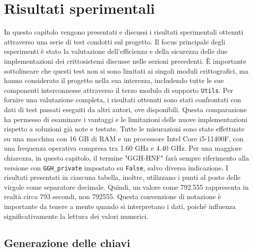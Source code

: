 \chapter{Risultati sperimentali}
\label{sec:risultati_sperimentali}

In questo capitolo vengono presentati e discussi i risultati sperimentali ottenuti 
attraverso una serie di test condotti sul progetto.
Il focus principale degli esperimenti è stato la valutazione dell'efficienza e della 
sicurezza delle due implementazioni dei crittosistemi discusse nelle sezioni precedenti. 
È importante sottolineare che questi test non si sono limitati ai singoli moduli 
crittografici, ma hanno considerato il progetto nella sua interezza, includendo tutte 
le sue componenti interconnesse attraverso il terzo modulo di supporto \texttt{Utils}.
Per fornire una valutazione completa, i risultati ottenuti sono stati confrontati con dati 
di test passati eseguiti da altri autori, ove disponibili. 
Questa comparazione ha permesso di esaminare i vantaggi e le limitazioni delle nuove 
implementazioni rispetto a soluzioni già note e testate.
Tutte le misurazioni sono state effettuate su una macchina con 16 GB di RAM e un processore 
Intel Core i5-11400F, con una frequenza operativa compresa tra 1.60 GHz e 4.40 GHz.
Per una maggiore chiarezza, in questo capitolo, il termine "GGH-HNF" farà sempre riferimento 
alla versione con \texttt{GGH\_private} impostato su \texttt{False}, salvo diversa indicazione.
I risultati presentati in ciascuna tabella, inoltre, utilizzano i punti al posto delle virgole come 
separatore decimale. Quindi, un valore come 792.555 rappresenta in realtà 
circa 793 secondi, non 792555. Questa convenzione di notazione è importante da 
tenere a mente quando si interpretano i dati, poiché influenza significativamente la 
lettura dei valori numerici.

\section{Generazione delle chiavi}
\label{sec:risultati_chiavi}

